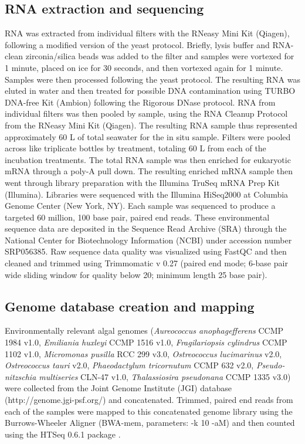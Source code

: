 \subsection{RNA extraction and sequencing}
RNA was extracted from individual filters with the RNeasy Mini Kit (Qiagen), following a modified version of the yeast protocol. Briefly, lysis buffer and RNA-clean zirconia/silica beads was added to the filter and samples were vortexed for 1 minute, placed on ice for 30 seconds, and then vortexed again for 1 minute. Samples were then processed following the yeast protocol. The resulting RNA was eluted in water and then treated for possible DNA contamination using TURBO DNA-free Kit (Ambion) following the Rigorous DNase protocol. RNA from individual filters was then pooled by sample, using the RNA Cleanup Protocol from the RNeasy Mini Kit (Qiagen). The resulting RNA sample thus represented approximately 60 L of total seawater for the in situ sample. Filters were pooled across like triplicate bottles by treatment, totaling 60 L from each of the incubation treatments. The total RNA sample was then enriched for eukaryotic mRNA through a poly-A pull down. The resulting enriched mRNA sample then went through library preparation with the Illumina TruSeq mRNA Prep Kit (Illumina). Libraries were sequenced with the Illumina HiSeq2000 at Columbia Genome Center (New York, NY). Each sample was sequenced to produce a targeted 60 million, 100 base pair, paired end reads. These environmental sequence data are deposited in the Sequence Read Archive (SRA) through the National Center for Biotechnology Information (NCBI) under accession number SRP056385. Raw sequence data quality was visualized using FastQC and then cleaned and trimmed using Trimmomatic v 0.27 (paired end mode; 6-base pair wide sliding window for quality below 20; minimum length 25 base pair). \par
\subsection{Genome database creation and mapping}
Environmentally relevant algal genomes (\textit{Aureococcus anophagefferens} CCMP 1984 v1.0, \textit{Emiliania huxleyi} CCMP 1516 v1.0, \textit{Fragilariopsis cylindrus} CCMP 1102 v1.0, \textit{Micromonas pusilla} RCC 299 v3.0, \textit{Ostreococcus lucimarinus} v2.0, \textit{Ostreococcus tauri} v2.0, \textit{Phaeodactylum tricornutum} CCMP 632 v2.0, \textit{Pseudo-nitzschia multiseries} CLN-47 v1.0, \textit{Thalassiosira pseudonana} CCMP 1335 v3.0) were collected from the Joint Genome Institute (JGI) database (http://genome.jgi-psf.org/) and concatenated. Trimmed, paired end reads from each of the samples were mapped to this concatenated genome library using the Burrows-Wheeler Aligner \citep{Li2010} (BWA-mem, parameters: -k 10 -aM) and then counted using the HTSeq 0.6.1 package \citep{Anders2014}.\par 
